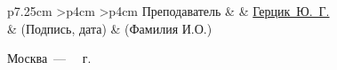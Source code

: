 \documentclass{bmstu}
\newenvironment{signstabular}[1][1]{
	\renewcommand*{\arraystretch}{#1}
	\tabular
}{
	\endtabular
}
\begin{document}
\begin{titlepage}
\begin{table}[h!]
			\vspace{\baselineskip}
			
			\begin{signstabular}[0.7]{p{7.25cm} >{\centering\arraybackslash}p{4cm} >{\centering\arraybackslash}p{4cm}}
				Преподаватель  & \uline{\mbox{\hspace*{4cm}}} & \uline{\hfill Герцик~Ю.~Г. \hfill} \\
				& \scriptsize (Подпись, дата) & \scriptsize (Фамилия И.О.)
			\end{signstabular}
			
		\end{table}
		
		\begin{center}
			\vfill
			Москва~---~\the\year
			~г.
		\end{center}
		\restoregeometry
	\end{titlepage}
	
	\maketableofcontents
	
	
	
	
	
	
	
	
	\makebibliography
	
\end{document}
